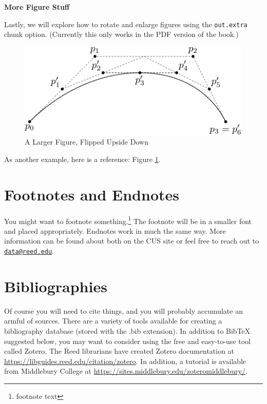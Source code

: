 \documentclass[12pt,twoside]{reedthesis}
\begin{document}
\textbf{More Figure Stuff}

Lastly, we will explore how to rotate and enlarge figures using the \texttt{out.extra} chunk option. (Currently this only works in the PDF version of the book.)
\begin{figure}
\includegraphics[angle=180, scale=1.1]{figure/subdivision} \caption{A Larger Figure, Flipped Upside Down}\label{fig:subd2}
\end{figure}
As another example, here is a reference: Figure \ref{fig:subd2}.

\hypertarget{footnotes-and-endnotes}{%
\section{Footnotes and Endnotes}\label{footnotes-and-endnotes}}

You might want to footnote something.\footnote{footnote text} The footnote will be in a smaller font and placed appropriately. Endnotes work in much the same way. More information can be found about both on the CUS site or feel free to reach out to \href{mailto:data@reed.edu}{\nolinkurl{data@reed.edu}}.

\hypertarget{bibliographies}{%
\section{Bibliographies}\label{bibliographies}}

Of course you will need to cite things, and you will probably accumulate an armful of sources. There are a variety of tools available for creating a bibliography database (stored with the .bib extension). In addition to BibTeX suggested below, you may want to consider using the free and easy-to-use tool called Zotero. The Reed librarians have created Zotero documentation at \url{https://libguides.reed.edu/citation/zotero}. In addition, a tutorial is available from Middlebury College at \url{https://sites.middlebury.edu/zoteromiddlebury/}.
\end{document}
